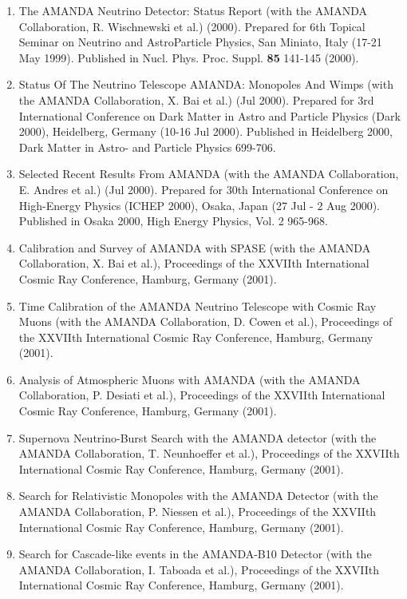 \begin{enumerate}
\item The AMANDA Neutrino Detector: Status Report (with the AMANDA Collaboration, R. Wischnewski et al.) (2000).  Prepared for 6th Topical Seminar on Neutrino and AstroParticle Physics, San Miniato, Italy (17-21 May 1999).  Published in Nucl. Phys. Proc. Suppl. {\bf 85} 141-145 (2000). 

\item Status Of The Neutrino Telescope AMANDA: Monopoles And Wimps (with the AMANDA Collaboration, X. Bai et al.) (Jul 2000).  Prepared for 3rd International Conference on Dark Matter in Astro and Particle Physics (Dark 2000), Heidelberg, Germany (10-16 Jul 2000).  Published in Heidelberg 2000, Dark Matter in Astro- and Particle Physics 699-706. 

\item Selected Recent Results From AMANDA (with the AMANDA Collaboration, E. Andres et al.) (Jul 2000).  Prepared for 30th International Conference on High-Energy Physics (ICHEP 2000), Osaka, Japan (27 Jul - 2 Aug 2000).  Published in Osaka 2000, High Energy Physics, Vol. 2 965-968. 

\item Calibration and Survey of AMANDA with SPASE (with the AMANDA Collaboration, X. Bai et al.), Proceedings of the XXVIIth International Cosmic Ray Conference, Hamburg, Germany (2001).

\item Time Calibration of the AMANDA Neutrino Telescope with Cosmic Ray Muons (with the AMANDA Collaboration, D. Cowen et al.), Proceedings of the XXVIIth International Cosmic Ray Conference, Hamburg, Germany (2001).

\item Analysis of Atmospheric Muons with AMANDA (with the AMANDA Collaboration, P. Desiati et al.), Proceedings of the XXVIIth International Cosmic Ray Conference, Hamburg, Germany (2001).

\item Supernova Neutrino-Burst Search with the AMANDA detector (with the AMANDA Collaboration, T. Neunhoeffer et al.), Proceedings of the XXVIIth International Cosmic Ray Conference, Hamburg, Germany (2001).

\item Search for Relativistic Monopoles with the AMANDA Detector (with the AMANDA Collaboration, P. Niessen et al.), Proceedings of the XXVIIth International Cosmic Ray Conference, Hamburg, Germany (2001).

\item Search for Cascade-like events in the AMANDA-B10 Detector (with the AMANDA Collaboration, I. Taboada et al.), Proceedings of the XXVIIth International Cosmic Ray Conference, Hamburg, Germany (2001).


\end{enumerate}
